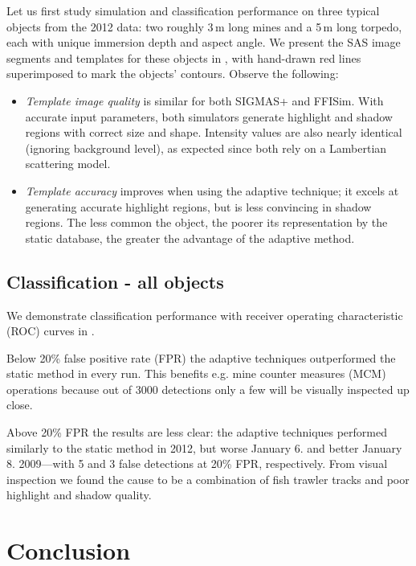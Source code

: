 Let us first study simulation and classification performance on three typical objects from the 2012 data: two roughly 3\,m long mines and a 5\,m long torpedo, each with unique immersion depth and aspect angle. We present the SAS image segments and templates for these objects in , with hand-drawn red lines superimposed to mark the objects' contours. Observe the following:
%
\begin{itemize}
\item \emph{Template image quality} is similar for both SIGMAS+ and FFISim. With accurate input parameters, both simulators generate highlight and shadow regions with correct size and shape. Intensity values are also nearly identical (ignoring background level), as expected since both rely on a Lambertian scattering model.
\item \emph{Template accuracy} improves when using the adaptive technique; it excels at generating accurate highlight regions, but is less convincing in shadow regions. The less common the object, the poorer its representation by the static database, the greater the advantage of the adaptive method.
\end{itemize}



\subsection{Classification - all objects}

We demonstrate classification performance with receiver operating characteristic (ROC) curves in . 

Below 20\% false positive rate (FPR) the adaptive techniques outperformed the static method in every run. This benefits e.g. mine counter measures (MCM) operations because out of 3000 detections only a few will be visually inspected up close.

Above 20\% FPR the results are less clear: the adaptive techniques performed similarly to the static method in 2012, but worse January 6. and better January 8. 2009---with 5 and 3 false detections at 20\% FPR, respectively. From visual inspection we found the cause to be a combination of fish trawler tracks and poor highlight and shadow quality.



\section{Conclusion}\label{IV_conclusion}

